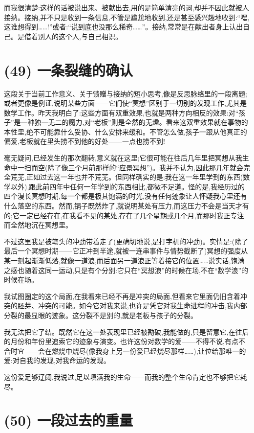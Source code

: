 而我很清楚:这样的话被说出来、被献出去,用的是简单清亮的词,却并不因此就被人接纳。接纳,并不只是收到一条信息,不管是尴尬地收到,还是甚至感兴趣地收到:“嘿,这谁想得到……!”或者:“说到底也没那么稀奇……”。接纳,常常是在献出者身上认出自己。是借着别人的这个人,与自己相识。

\section{(49) 一条裂缝的确认}

这段关于当前工作意义、关于馈赠与接纳的短小思考,像是反思脉络里的一段离题;或者更像是例证,说明某些方面——它们使“冥想”区别于一切别的发现工作,尤其是数学工作。昨天我明白了:这些方面有双重效果,也就是两种方向相反的效果:对“孩子”是一种独一无二的魔力,对“老板”则是全然的无趣。看来这双重效果就在事物的本性里,绝不可能靠什么妥协、什么安排来缓和。不管怎么做,孩子一跟从他真正的偏爱,老板就在里头捞不到他的好处——一点也捞不到!

 毫无疑问,已经发生的那次翻转,意义就在这里;它很可能在往后几年里把冥想从我生命中一扫而空(除了像三个月前那样的“应景冥想”)。我并不认为,因此那几年就会完全荒芜,正如过去这一年也并不荒芜。但同样确实的是:我在这一年里学到的东西(数学以外),跟此前四年中任何一年学到的东西相比,都微不足道。怪的是,我经历过的四个漫长冥想时期,每一个都是极其饱满的时光,没有任何迹象让人怀疑我心里还有什么落空的东西。然而,锅子既然炸了,就说明某处有压力,而这压力不会是当天才有的;它一定已经存在,在我看不见的某处,存在了几个星期或几个月,而那时我正专注而全然地沉在冥想里。

 不过这里我是被笔头的冲劲带着走了(更确切地说,是打字机的冲劲)。实情是:(除了最后一个冥想时期——它正冲到半途,就被一连串事件与情势截断了)冥想的强度从某一刻起渐渐低落,就像一道浪,而后面另一道浪正等着接它的位置……说实话,饱满之感也随着这同一运动,只是有个分别:它只在“冥想浪”的时候在场,不在“数学浪”的时候在场。

我试图圈定的这个局面,在我看来已经不再是冲突的局面,但看来它里面仍旧含着冲突的胚芽、冲突的可能。如今它对我来说,也许是凭它对我生命进程的冲击,我内部分裂的最显眼的迹象。这分裂不是别的,就是老板与孩子的分裂。

我无法把它了结。既然它在这一处表现里已经被勘破,我能做的,只是留意它,在往后的月份和年份里追索它的迹象与演变。也许这份对数学的爱——不得不说,有点不合时宜——会在燃烧中烧尽(像我身上另一份爱已经烧尽那样……),让位给那唯一的爱:对自我的发现,对我命运的发现。

这份爱足够辽阔,我说过,足以填满我的生命——而我的整个生命肯定也不够把它耗尽。

\section{(50) 一段过去的重量}

